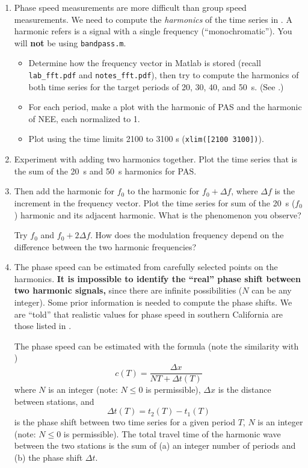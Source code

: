 \documentclass[11pt,titlepage,fleqn]{article}
\begin{document}
\begin{enumerate}

\item Phase speed measurements are more difficult than group speed measurements. We need to compute the {\em harmonics} of the time series in . A harmonic refers is a signal with a single frequency (``monochromatic'').
You will {\bf not} be using \verb+bandpass.m+.
%
\begin{itemize}
\item Determine how the frequency vector in Matlab is stored (recall \verb+lab_fft.pdf+ and \verb+notes_fft.pdf+), then try to compute the harmonics of both time series for the target periods of 20, 30, 40, and 50~s. (See .)
\item For each period, make a plot with the harmonic of PAS and the harmonic of NEE, each normalized to 1.
\item Plot using the time limits 2100 to 3100 s (\verb+xlim([2100 3100])+).
\end{itemize}

\item Experiment with adding two harmonics together. Plot the time series that is the sum of the 20~s and 50~s harmonics for PAS.

\item Then add the harmonic for $f_0$ to the harmonic for $f_0 + \Delta f$, where $\Delta f$ is the increment in the frequency vector. Plot the time series for sum of the 20~s ($f_0$) harmonic and its adjacent harmonic. What is the phenomenon you observe?

Try $f_0$ and $f_0 + 2\Delta f$. How does the modulation frequency depend on the difference between the two harmonic frequencies?

\item The phase speed can be estimated from carefully selected points on the harmonics. {\bf It is impossible to identify the ``real'' phase shift between two harmonic signals,} since there are infinite possibilities ($N$ can be any integer). Some prior information is needed to compute the phase shifts. We are ``told'' that realistic values for phase speed in southern California are those listed in .

The phase speed can be estimated with the formula (note the similarity with )
%
\begin{equation}
c(T) = \frac{\Delta x}{N T + \Delta t(T)}
\label{phase}
\end{equation}
%
where $N$ is an integer (note: $N \le 0$ is permissible), $\Delta x$ is the distance between stations, and
%
\begin{equation*}
\Delta t(T) = t_2(T) - t_1(T)
\end{equation*}
%
is the phase shift between two time series for a given period $T$, $N$ is an integer (note: $N \le 0$ is permissible). The total travel time of the harmonic wave between the two stations is the sum of (a) an integer number of periods and (b) the phase shift $\Delta t$.


\end{enumerate}
\end{document}
